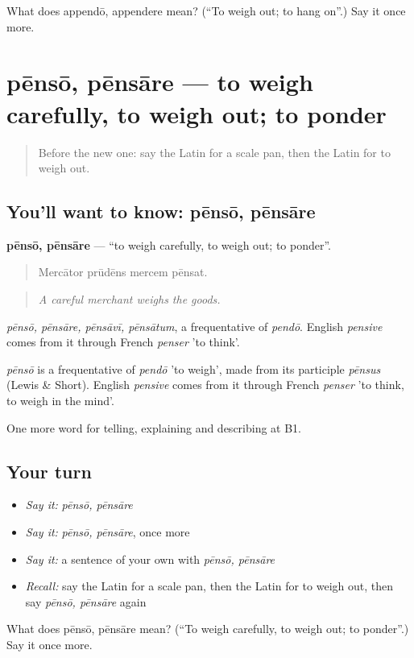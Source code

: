 \begin{tcolorbox}[breakable,colback=teal!4,colframe=teal!35!black,title={Before you move on}]
What does appendō, appendere mean? (\textquotedblleft{}To weigh out; to hang on\textquotedblright{}.) Say it once more.
\end{tcolorbox}
\section[pēnsō, pēnsāre]{pēnsō, pēnsāre — to weigh carefully, to weigh out; to ponder}

\label{lesson:LA-C464-penso}



\begin{quote}
Before the new one: say the Latin for a scale pan, then the Latin for to weigh out.
\end{quote}

\subsection*{You'll want to know: pēnsō, pēnsāre}
\textbf{pēnsō, pēnsāre} — \textquotedblleft{}to weigh carefully, to weigh out; to ponder\textquotedblright{}.

\begin{quote}
Mercātor prūdēns mercem pēnsat.
\end{quote}

\begin{quote}
\emph{A careful merchant weighs the goods.}
\end{quote}

\emph{pēnsō, pēnsāre, pēnsāvī, pēnsātum}, a frequentative of \emph{pendō}. English \emph{pensive} comes from it through French \emph{penser} 'to think'.

\begin{cousinweb}
\emph{pēnsō} is a frequentative of \emph{pendō} 'to weigh', made from its participle \emph{pēnsus} (Lewis \& Short). English \emph{pensive} comes from it through French \emph{penser} 'to think, to weigh in the mind'.
\end{cousinweb}

\begin{grammarlens}[title={What you've built}]
One more word for telling, explaining and describing at B1.
\end{grammarlens}

\subsection*{Your turn}
\begin{itemize}
\raggedright
  \item \emph{Say it:} \emph{pēnsō, pēnsāre}
  \item \emph{Say it:} \emph{pēnsō, pēnsāre}, once more
  \item \emph{Say it:} a sentence of your own with \emph{pēnsō, pēnsāre}
  \item \emph{Recall:} say the Latin for a scale pan, then the Latin for to weigh out, then say \emph{pēnsō, pēnsāre} again
\end{itemize}

\begin{tcolorbox}[breakable,colback=teal!4,colframe=teal!35!black,title={Before you move on}]
What does pēnsō, pēnsāre mean? (\textquotedblleft{}To weigh carefully, to weigh out; to ponder\textquotedblright{}.) Say it once more.
\end{tcolorbox}

